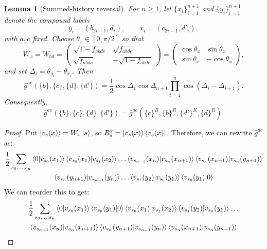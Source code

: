 \documentclass[aps,floatfix,10pt,amssymb,amsfont,amsmath,superscriptaddress,float,nofootinbib,longbibliography,nobalancelastpage,twocolumn]{revtex4-2}
\newtheorem{lemma}{Lemma}
\begin{document}
\begin{widetext}
\begin{lemma}[Summed-history reversal]
\label{lemma:summed-history-reversal}
For $n\geq1$, let $\{x_i\}_{i=1}^{n+1}$ and $\{y_i\}_{i=1}^{n+1}$ denote
the compound labels
\begin{equation*}
    y_i=(b_{2i-1},d_i),\qquad x_i=(c_{2i-1},d'_i),
\end{equation*}
with $a,e$ fixed.  Choose $\theta_x\in[0,\pi/2]$ so that
\begin{equation*}
    W_x=W_{bd}=\begin{pmatrix}
                \sqrt{1 - f_{abde}} & \sqrt{f_{abde}}\\
       \sqrt{f_{abde}} & -\sqrt{1 - f_{abde}}
    \end{pmatrix}= \begin{pmatrix}\cos\theta_x&\sin\theta_x\\
    \sin\theta_x&-\cos\theta_x\end{pmatrix},
\end{equation*}
and set $\Delta_i=\theta_{y_i}-\theta_{x_i}$.  Then
\begin{equation}
    \bar g^{ae}(\{b\},\{c\},\{d\},\{d'\})
    =\frac12\cos\Delta_1\cos\Delta_{n+1}
      \prod_{i=1}^{n}\cos(\Delta_i-\Delta_{i+1}).
\end{equation}
Consequently,
\begin{equation}
    \bar g^{ae}(\{b\},\{c\},\{d\},\{d'\})
    =\bar g^{ae}(\{c\}^R,\{b\}^R,\{d'\}^R,\{d\}^R).
    \label{eq:PRR}
\end{equation}
\end{lemma}
\begin{proof}
Put $\ket{v_s(x)}=W_x\ket{s}$, so
$R_s^x=\ket{v_s(x)}\bra{v_s(x)}$. Therefore, we can rewrite $\bar g^{ae}$ as:
\begin{multline}
    \frac{1}{2}\sum_{s_0,\ldots,s_n} \braket{0|v_{s_0}(x_1)}\braket{v_{s_0}(x_1)|v_{s_1}(x_2)}\ldots \braket{v_{s_{n-1}}(x_n)|v_{s_n}(x_{n+1})}\braket{v_{s_n}(x_{n+1})|v_{s_n}(y_{n+1})}\\\braket{v_{s_n}(y_{n+1})|v_{s_{n-1}}(y_n)}\ldots\braket{v_{s_1}(y_2)|v_{s_0}(y_1)}\braket{v_{s_0}(y_1)|0}
\end{multline}
We can reorder this to get:
\begin{multline}
    \frac{1}{2}\sum_{s_0,\ldots,s_n} \braket{0|v_{s_0}(x_1)}\braket{v_{s_0}(y_1)|0}\braket{v_{s_0}(x_1)|v_{s_1}(x_2)}\braket{v_{s_1}(y_2)|v_{s_0}(y_1)}\ldots\\ \braket{v_{s_{n-1}}(x_{n})|v_{s_{n}}(x_{n+1})}\braket{v_{s_{n}}(y_{n+1})|v_{s_{n-1}}(y_{n})}\braket{v_{s_{n}}(x_{n+1})|v_{s_{n}}(y_{n+1})}

\end{multline}
\end{proof}
\end{widetext}
\end{document}
